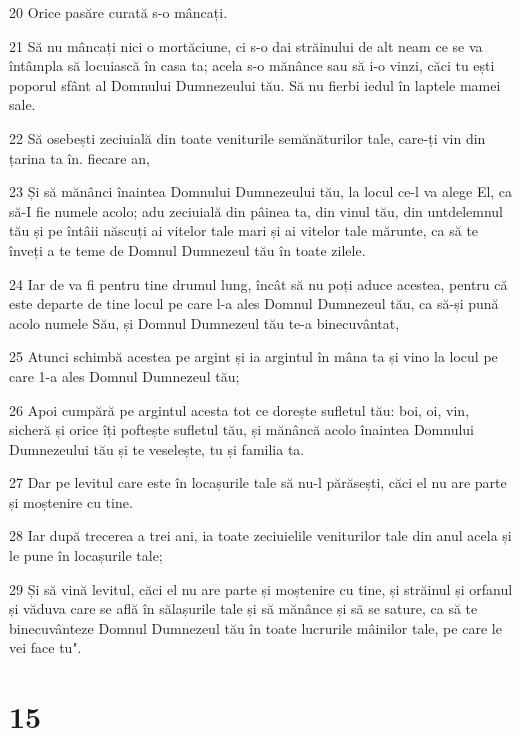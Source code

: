 \par 20 Orice pasăre curată s-o mâncați.
\par 21 Să nu mâncați nici o mortăciune, ci s-o dai străinului de alt neam ce se va întâmpla să locuiască în casa ta; acela s-o mănânce sau să i-o vinzi, căci tu ești poporul sfânt al Domnului Dumnezeului tău. Să nu fierbi iedul în laptele mamei sale.
\par 22 Să osebești zeciuială din toate veniturile semănăturilor tale, care-ți vin din țarina ta în. fiecare an,
\par 23 Și să mănânci înaintea Domnului Dumnezeului tău, la locul ce-l va alege El, ca să-I fie numele acolo; adu zeciuială din pâinea ta, din vinul tău, din untdelemnul tău și pe întâii născuți ai vitelor tale mari și ai vitelor tale mărunte, ca să te înveți a te teme de Domnul Dumnezeul tău în toate zilele.
\par 24 Iar de va fi pentru tine drumul lung, încât să nu poți aduce acestea, pentru că este departe de tine locul pe care l-a ales Domnul Dumnezeul tău, ca să-și pună acolo numele Său, și Domnul Dumnezeul tău te-a binecuvântat,
\par 25 Atunci schimbă acestea pe argint și ia argintul în mâna ta și vino la locul pe care 1-a ales Domnul Dumnezeul tău;
\par 26 Apoi cumpără pe argintul acesta tot ce dorește sufletul tău: boi, oi, vin, sicheră și orice îți poftește sufletul tău, și mănâncă acolo înaintea Domnului Dumnezeului tău și te veselește, tu și familia ta.
\par 27 Dar pe levitul care este în locașurile tale să nu-l părăsești, căci el nu are parte și moștenire cu tine.
\par 28 Iar după trecerea a trei ani, ia toate zeciuielile veniturilor tale din anul acela și le pune în locașurile tale;
\par 29 Și să vină levitul, căci el nu are parte și moștenire cu tine, și străinul și orfanul și văduva care se află în sălașurile tale și să mănânce și să se sature, ca să te binecuvânteze Domnul Dumnezeul tău în toate lucrurile mâinilor tale, pe care le vei face tu".

\chapter{15}

